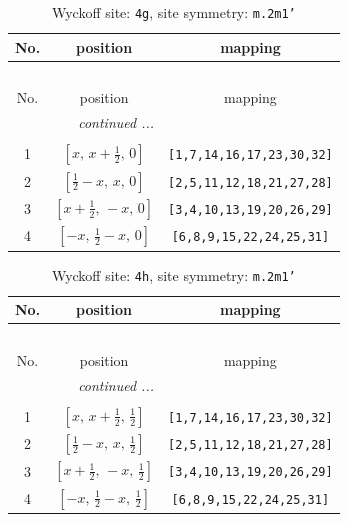 \documentclass[fleqn,8pt]{jsarticle}
\begin{document}
\renewcommand{\arraystretch}{1.2}
\begin{longtable}{ccc}
\caption{Wyckoff site: {\tt 4g}, site symmetry: {\tt m.2m1'}}
 \\
 \hline \hline
No. & position & mapping \\ \hline \endfirsthead

\multicolumn{2}{l}{\tablename\ \thetable{}} \\
 \hline \hline
No. & position & mapping \\ \hline \endhead

 \hline \hline
\multicolumn{2}{r}{\footnotesize\it continued ...} \\ \endfoot

 \hline \hline
\multicolumn{2}{r}{} \\ \endlastfoot

1 & $\left[ x,\, x + \frac{1}{2},\, 0 \right]$ & {\tt [1,7,14,16,17,23,30,32]} \\ \hline
2 & $\left[ \frac{1}{2} - x,\, x,\, 0 \right]$ & {\tt [2,5,11,12,18,21,27,28]} \\ \hline
3 & $\left[ x + \frac{1}{2},\, - x,\, 0 \right]$ & {\tt [3,4,10,13,19,20,26,29]} \\ \hline
4 & $\left[ - x,\, \frac{1}{2} - x,\, 0 \right]$ & {\tt [6,8,9,15,22,24,25,31]} \\
\end{longtable}
\renewcommand{\arraystretch}{1.2}
\begin{longtable}{ccc}
\caption{Wyckoff site: {\tt 4h}, site symmetry: {\tt m.2m1'}}
 \\
 \hline \hline
No. & position & mapping \\ \hline \endfirsthead

\multicolumn{2}{l}{\tablename\ \thetable{}} \\
 \hline \hline
No. & position & mapping \\ \hline \endhead

 \hline \hline
\multicolumn{2}{r}{\footnotesize\it continued ...} \\ \endfoot

 \hline \hline
\multicolumn{2}{r}{} \\ \endlastfoot

1 & $\left[ x,\, x + \frac{1}{2},\, \frac{1}{2} \right]$ & {\tt [1,7,14,16,17,23,30,32]} \\ \hline
2 & $\left[ \frac{1}{2} - x,\, x,\, \frac{1}{2} \right]$ & {\tt [2,5,11,12,18,21,27,28]} \\ \hline
3 & $\left[ x + \frac{1}{2},\, - x,\, \frac{1}{2} \right]$ & {\tt [3,4,10,13,19,20,26,29]} \\ \hline
4 & $\left[ - x,\, \frac{1}{2} - x,\, \frac{1}{2} \right]$ & {\tt [6,8,9,15,22,24,25,31]} \\
\end{longtable}
\end{document}

